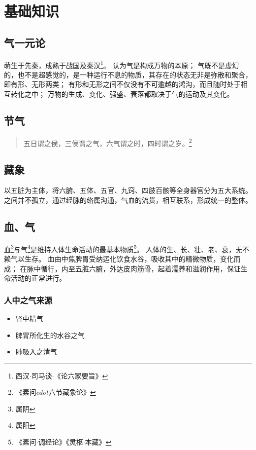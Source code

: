 \chapter{基础知识}

\section{气一元论}
萌生于先秦，成熟于战国及秦汉\footnote{西汉$\cdot$司马谈$\cdot$《论六家要旨》}。
认为气是构成万物的本原；
气既不是虚幻的，也不是超感觉的，是一种运行不息的物质，其存在的状态无非是弥散和聚合，即有形、无形两类；
有形和无形之间不仅没有不可逾越的鸿沟，而且随时处于相互转化之中；
万物的生成、变化、强盛、衰落都取决于气的运动及其变化。






\section{节气}
\begin{quote}
  五日谓之侯，三侯谓之气，六气谓之时，四时谓之岁。\footnote{《素问$cdot$六节藏象论》}
\end{quote}


\section{藏象}
以五脏为主体，将六腑、五体、五官、九窍、四肢百骸等全身器官分为五大系统。
之间并不孤立，通过经脉的络属沟通，气血的流贯，相互联系，形成统一的整体。

\section{血、气}
血\footnote{属阴}与气\footnote{属阳}是维持人体生命活动的最基本物质\footnote{《素问$\cdot$调经论》《灵枢$\cdot$本藏》}。
人体的生、长、壮、老、衰，无不赖气以生存。
血由中焦脾胃受纳运化饮食水谷，吸收其中的精微物质，变化而成；
在脉中循行，内至五脏六腑，外达皮肉筋骨，起着濡养和滋润作用，保证生命活动的正常进行。
\subsection{人中之气来源}
\begin{itemize}
  \item 肾中精气
  \item 脾胃所化生的水谷之气
  \item 肺吸入之清气
\end{itemize}

